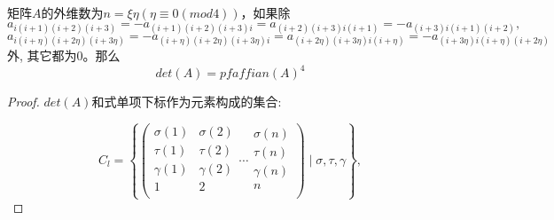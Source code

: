 \documentclass[twoside,a4paper,CCT]{cctart}   %
\begin{document}
\begin{theorem}
矩阵$A$的外维数为$n=\xi\eta(\eta \equiv 0 (mod 4))$，如果除$$a_{i(i+1)(i+2)(i+3)}=-a_{(i+1)(i+2)(i+3)i}=a_{(i+2)(i+3)i(i+1)}=-a_{(i+3)i(i+1)(i+2)},$$$$a_{i(i+\eta)(i+2\eta)(i+3\eta)}=-a_{(i+\eta)(i+2\eta)(i+3\eta)i}=a_{(i+2\eta)(i+3\eta)i(i+\eta)}=-a_{(i+3\eta)i(i+\eta)(i+2\eta)}$$ 外, 其它都为0。那么$$det(A)=pfaffian(A)^{4}$$
\end{theorem}

\begin{proof}
$det(A)$和式单项下标作为元素构成的集合:

$$C_{l} = \left\{
\left(                 %
  \begin{array}{ccc}   %
    \sigma(1) \\  %
    \tau(1) \\  %
    \gamma(1)\\
    1\\
  \end{array}
  \begin{array}{ccc}   %
    \sigma(2) \\  %
    \tau(2) \\  %
    \gamma(2)\\
    2\\
  \end{array}
\cdots            %
  \begin{array}{ccc}   %
    \sigma(n) \\  %
    \tau(n) \\  %
    \gamma(n)\\
    n\\
  \end{array}
\right)
\mid \sigma,\tau,\gamma \right\},$$


\end{proof}
\end{document}
